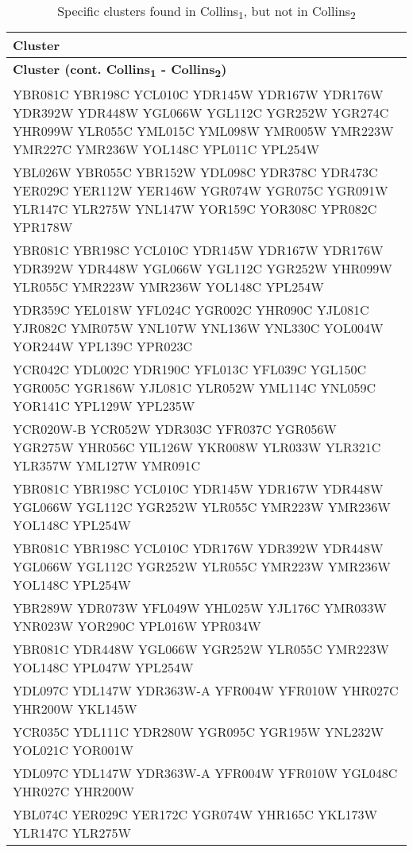 \setlength{\extrarowheight}{2pt}
\renewcommand{\arraystretch}{1.2}
\begin{longtable}{| m{27em} |}
\caption{Specific clusters found in Collins\textsubscript{1}, but not in Collins\textsubscript{2}} \\
\hline
\textbf{Cluster} \\
\hline
\endfirsthead
\hline
\textbf{Cluster (cont. Collins\textsubscript{1} - Collins\textsubscript{2})} \\
\hline
\endhead
\hline
\endfoot
\hline
\endlastfoot
YBR081C YBR198C YCL010C YDR145W YDR167W YDR176W YDR392W YDR448W YGL066W YGL112C YGR252W YGR274C YHR099W YLR055C YML015C YML098W YMR005W YMR223W YMR227C YMR236W YOL148C YPL011C YPL254W \\
\hline
YBL026W YBR055C YBR152W YDL098C YDR378C YDR473C YER029C YER112W YER146W YGR074W YGR075C YGR091W YLR147C YLR275W YNL147W YOR159C YOR308C YPR082C YPR178W \\
\hline
YBR081C YBR198C YCL010C YDR145W YDR167W YDR176W YDR392W YDR448W YGL066W YGL112C YGR252W YHR099W YLR055C YMR223W YMR236W YOL148C YPL254W \\
\hline
YDR359C YEL018W YFL024C YGR002C YHR090C YJL081C YJR082C YMR075W YNL107W YNL136W YNL330C YOL004W YOR244W YPL139C YPR023C \\
\hline
YCR042C YDL002C YDR190C YFL013C YFL039C YGL150C YGR005C YGR186W YJL081C YLR052W YML114C YNL059C YOR141C YPL129W YPL235W \\
\hline
YCR020W-B YCR052W YDR303C YFR037C YGR056W YGR275W YHR056C YIL126W YKR008W YLR033W YLR321C YLR357W YML127W YMR091C \\
\hline
YBR081C YBR198C YCL010C YDR145W YDR167W YDR448W YGL066W YGL112C YGR252W YLR055C YMR223W YMR236W YOL148C YPL254W \\
\hline
YBR081C YBR198C YCL010C YDR176W YDR392W YDR448W YGL066W YGL112C YGR252W YLR055C YMR223W YMR236W YOL148C YPL254W \\
\hline
YBR289W YDR073W YFL049W YHL025W YJL176C YMR033W YNR023W YOR290C YPL016W YPR034W \\
\hline
YBR081C YDR448W YGL066W YGR252W YLR055C YMR223W YOL148C YPL047W YPL254W \\
\hline
YDL097C YDL147W YDR363W-A YFR004W YFR010W YHR027C YHR200W YKL145W \\
\hline
YCR035C YDL111C YDR280W YGR095C YGR195W YNL232W YOL021C YOR001W \\
\hline
YDL097C YDL147W YDR363W-A YFR004W YFR010W YGL048C YHR027C YHR200W \\
\hline
YBL074C YER029C YER172C YGR074W YHR165C YKL173W YLR147C YLR275W \\

\end{longtable}

